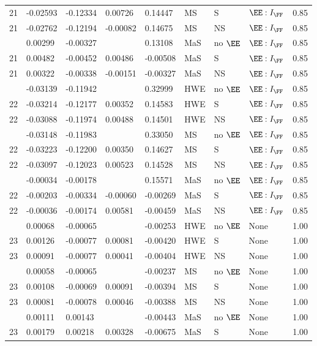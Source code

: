 \begin{longtable}[t]{lllllllll}
21 & -0.02593 & -0.12334 & 0.00726 & 0.14447 & MS & S & $\EE:I_{\FF}$ & 0.85\\
21 & -0.02762 & -0.12194 & -0.00082 & 0.14675 & MS & NS & $\EE:I_{\FF}$ & 0.85\\
\addlinespace
21 & 0.00299 & -0.00327 &  & 0.13108 & MaS & no $\EE$ & $\EE:I_{\FF}$ & 0.85\\
21 & 0.00482 & -0.00452 & 0.00486 & -0.00508 & MaS & S & $\EE:I_{\FF}$ & 0.85\\
21 & 0.00322 & -0.00338 & -0.00151 & -0.00327 & MaS & NS & $\EE:I_{\FF}$ & 0.85\\
\addlinespace
22 & -0.03139 & -0.11942 &  & 0.32999 & HWE & no $\EE$ & $\EE:I_{\FF}$ & 0.85\\
22 & -0.03214 & -0.12177 & 0.00352 & 0.14583 & HWE & S & $\EE:I_{\FF}$ & 0.85\\
22 & -0.03088 & -0.11974 & 0.00488 & 0.14501 & HWE & NS & $\EE:I_{\FF}$ & 0.85\\
\addlinespace
22 & -0.03148 & -0.11983 &  & 0.33050 & MS & no $\EE$ & $\EE:I_{\FF}$ & 0.85\\
22 & -0.03223 & -0.12200 & 0.00350 & 0.14627 & MS & S & $\EE:I_{\FF}$ & 0.85\\
22 & -0.03097 & -0.12023 & 0.00523 & 0.14528 & MS & NS & $\EE:I_{\FF}$ & 0.85\\
\addlinespace
22 & -0.00034 & -0.00178 &  & 0.15571 & MaS & no $\EE$ & $\EE:I_{\FF}$ & 0.85\\
22 & -0.00203 & -0.00334 & -0.00060 & -0.00269 & MaS & S & $\EE:I_{\FF}$ & 0.85\\
22 & -0.00036 & -0.00174 & 0.00581 & -0.00459 & MaS & NS & $\EE:I_{\FF}$ & 0.85\\
\addlinespace
23 & 0.00068 & -0.00065 &  & -0.00253 & HWE & no $\EE$ & None & 1.00\\
23 & 0.00126 & -0.00077 & 0.00081 & -0.00420 & HWE & S & None & 1.00\\
23 & 0.00091 & -0.00077 & 0.00041 & -0.00404 & HWE & NS & None & 1.00\\
\addlinespace
23 & 0.00058 & -0.00065 &  & -0.00237 & MS & no $\EE$ & None & 1.00\\
23 & 0.00108 & -0.00069 & 0.00091 & -0.00394 & MS & S & None & 1.00\\
23 & 0.00081 & -0.00078 & 0.00046 & -0.00388 & MS & NS & None & 1.00\\
\addlinespace
23 & 0.00111 & 0.00143 &  & -0.00443 & MaS & no $\EE$ & None & 1.00\\
23 & 0.00179 & 0.00218 & 0.00328 & -0.00675 & MaS & S & None & 1.00\\

\end{longtable}
